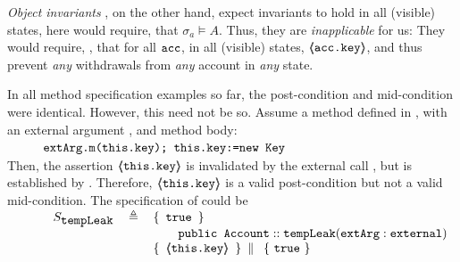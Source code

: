 {{\emph{Object invariants}}  \cite{Meyer92,MeyerDBC92,BarDelFahLeiSch04,objInvars,MuellerPoetzsch-HeffterLeavens06}, on the other hand, expect %
invariants to hold in all (visible) states,
here would require,  \eg that $\sigma_a \models A$. Thus, they  are %
\emph{inapplicable} for us: They would require, \eg, that for all %
 $\mbox{\normalfont{\texttt{acc}}}$, in all (visible) states, $\langle\!\!\langle \mbox{\normalfont{\texttt{acc.key}}} \rangle\!\!\rangle$, and thus prevent \emph{any} withdrawals from \emph{any} account in \emph{any} state.
 
 

In all  method specification examples so far, the post-condition and   mid-condition were identical.
However, this need not be so. 
Assume a method  defined in , with an external argument , and  method body:
\\
{\small{$\strut \hspace{1cm} \mbox{\normalfont{\texttt{extArg.m(this.key); this.key:=new Key}}}$}}
\\
Then, the assertion   $ \langle\!\!\langle \mbox{\normalfont{\texttt{this.key}}} \rangle\!\!\rangle$  is  invalidated by the external call , but is  established by .
Therefore, $ \langle\!\!\langle \mbox{\normalfont{\texttt{this.key}}} \rangle\!\!\rangle$  is a valid post-condition but not a valid   mid-condition.
The specification of  could be\\
{\small{$
{\sprepost
		{\strut \ \ \ \ \ \ \ \ \ S_{\prg{tempLeak}}} 
		{  \ \prg{true}\  }
		{\prg{public Account}} {\prg{tempLeak}} {\prg{extArg}:\prg{external}}
		{  \  \inside{\prg{this.key} }\  }
		{  \  \prg{true}\  }
}
$}}

 
 




 

}
